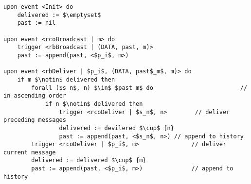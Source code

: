 \begin{lstlisting}[caption={Fail-Silent Reliable Causal Order broadcast}, mathescape, captionpos=b]
upon event <Init> do
    delivered := $\emptyset$
    past := nil

upon event <rcoBroadcast | m> do
    trigger <rbBroadcast | (DATA, past, m)>
    past := append(past, <$p_i$, m>)

upon event <rbDeliver | $p_i$, (DATA, past$_m$, m)> do
    if m $\notin$ delivered then
        forall ($s_n$, n) $\in$ $past_m$ do                         // in ascending order
            if n $\notin$ delivered then
                trigger <rcoDeliver | $s_n$, n>        // deliver preceding messages
                delivered := devilered $\cup$ {n}
                past := append(past, <$s_n$, n>) // append to history
        trigger <rcoDeliver | $p_i$, m>               // deliver current message
        delivered := delivered $\cup$ {m}
        past := append(past, <$p_i$, m>)              // append to history
\end{lstlisting}
